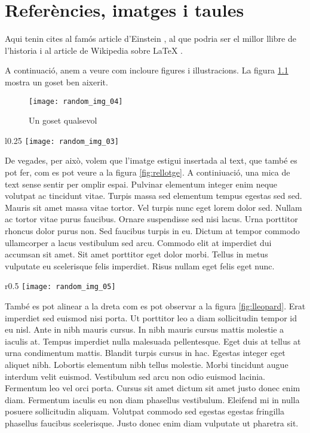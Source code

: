 \chapter{Referències, imatges i taules}
\label{cap:primer}
Aqui tenin cites al famós article d'Einstein \autocite{Einstein05}, al que podria ser el millor llibre de l'historia \Autocite{GMMarquez67} i al article de Wikipedia sobre \LaTeX{} \autocite{Wikipedia_LaTeX}.

A continuació, anem a veure com incloure figures i illustracions. La figura \ref{fig:gos} mostra un goset ben aixerit.
\begin{figure}[h]
    \centering
    \texttt{[image: random\_img\_04]}
    \caption{Un goset qualsevol}
    \label{fig:gos}
\end{figure}

\begin{wrapfigure}{l}{0.25\textwidth}
    \centering
    \texttt{[image: random\_img\_03]}
    \caption{El temps vola}
    \label{fig:rellotge}
\end{wrapfigure}

De vegades, per això, volem que l'imatge estigui insertada al text, que també es pot fer, com es pot veure a la figura \ref{fig:rellotge}. A continiuació, una mica de text sense sentir per omplir espai. Pulvinar elementum integer enim neque volutpat ac tincidunt vitae. Turpis massa sed elementum tempus egestas sed sed. Mauris sit amet massa vitae tortor. Vel turpis nunc eget lorem dolor sed. Nullam ac tortor vitae purus faucibus. Ornare suspendisse sed nisi lacus. Urna porttitor rhoncus dolor purus non. Sed faucibus turpis in eu. Dictum at tempor commodo ullamcorper a lacus vestibulum sed arcu. Commodo elit at imperdiet dui accumsan sit amet. Sit amet porttitor eget dolor morbi. Tellus in metus vulputate eu scelerisque felis imperdiet. Risus nullam eget felis eget nunc.

\begin{wrapfigure}{r}{0.5\textwidth}
    \centering
    \texttt{[image: random\_img\_05]}
    \caption{El lleopard}
    \label{fig:lleopard}
\end{wrapfigure}
També es pot alinear a la dreta com es pot observar a la figura \ref{fig:lleopard}. Erat imperdiet sed euismod nisi porta. Ut porttitor leo a diam sollicitudin tempor id eu nisl. Ante in nibh mauris cursus. In nibh mauris cursus mattis molestie a iaculis at. Tempus imperdiet nulla malesuada pellentesque. Eget duis at tellus at urna condimentum mattis. Blandit turpis cursus in hac. Egestas integer eget aliquet nibh. Lobortis elementum nibh tellus molestie. Morbi tincidunt augue interdum velit euismod. Vestibulum sed arcu non odio euismod lacinia. Fermentum leo vel orci porta. Cursus sit amet dictum sit amet justo donec enim diam. Fermentum iaculis eu non diam phasellus vestibulum. Eleifend mi in nulla posuere sollicitudin aliquam. Volutpat commodo sed egestas egestas fringilla phasellus faucibus scelerisque. Justo donec enim diam vulputate ut pharetra sit.

